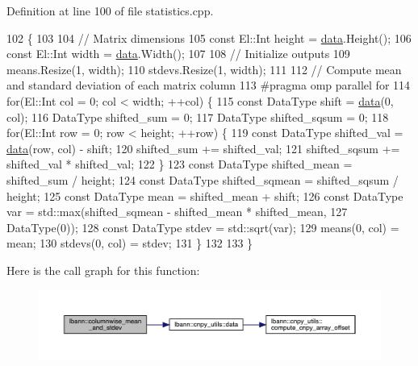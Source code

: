 Definition at line 100 of file statistics.\+cpp.


\begin{DoxyCode}
102                                             \{
103 
104   \textcolor{comment}{// Matrix dimensions}
105   \textcolor{keyword}{const} El::Int height = \hyperlink{namespacelbann_1_1cnpy__utils_a9ac86d96ccb1f8b4b2ea16441738781f}{data}.Height();
106   \textcolor{keyword}{const} El::Int width = \hyperlink{namespacelbann_1_1cnpy__utils_a9ac86d96ccb1f8b4b2ea16441738781f}{data}.Width();
107 
108   \textcolor{comment}{// Initialize outputs}
109   means.Resize(1, width);
110   stdevs.Resize(1, width);
111 
112   \textcolor{comment}{// Compute mean and standard deviation of each matrix column}
113 \textcolor{preprocessor}{  #pragma omp parallel for}
114   \textcolor{keywordflow}{for}(El::Int col = 0; col < width; ++col) \{
115     \textcolor{keyword}{const} DataType shift = \hyperlink{namespacelbann_1_1cnpy__utils_a9ac86d96ccb1f8b4b2ea16441738781f}{data}(0, col);
116     DataType shifted\_sum = 0;
117     DataType shifted\_sqsum = 0;
118     \textcolor{keywordflow}{for}(El::Int row = 0; row < height; ++row) \{
119       \textcolor{keyword}{const} DataType shifted\_val = \hyperlink{namespacelbann_1_1cnpy__utils_a9ac86d96ccb1f8b4b2ea16441738781f}{data}(row, col) - shift;
120       shifted\_sum += shifted\_val;
121       shifted\_sqsum += shifted\_val * shifted\_val;
122     \}
123     \textcolor{keyword}{const} DataType shifted\_mean = shifted\_sum / height;
124     \textcolor{keyword}{const} DataType shifted\_sqmean = shifted\_sqsum / height;
125     \textcolor{keyword}{const} DataType mean = shifted\_mean + shift;
126     \textcolor{keyword}{const} DataType var = std::max(shifted\_sqmean - shifted\_mean * shifted\_mean,
127                                   DataType(0));
128     \textcolor{keyword}{const} DataType stdev = std::sqrt(var);
129     means(0, col) = mean;
130     stdevs(0, col) = stdev;
131   \}
132 
133 \}
\end{DoxyCode}
Here is the call graph for this function\+:\nopagebreak
\begin{figure}[H]
\begin{center}
\leavevmode
\includegraphics[width=350pt]{namespacelbann_a213d429a27c3e8676a3ebec40c24005c_cgraph}
\end{center}
\end{figure}

